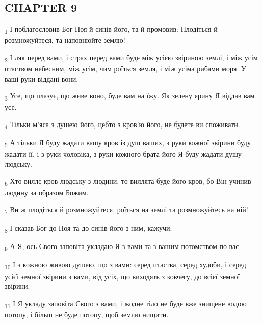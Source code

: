 \subsection{CHAPTER 9}
\begin{tcolorbox}
\textsubscript{1} І поблагословив Бог Ноя й синів його, та й промовив: Плодіться й розмножуйтеся, та наповнюйте землю!
\end{tcolorbox}
\begin{tcolorbox}
\textsubscript{2} І ляк перед вами, і страх перед вами буде між усією звіриною землі, і між усім птаством небесним, між усім, чим роїться земля, і між усіма рибами моря. У ваші руки віддані вони.
\end{tcolorbox}
\begin{tcolorbox}
\textsubscript{3} Усе, що плазує, що живе воно, буде вам на їжу. Як зелену ярину Я віддав вам усе.
\end{tcolorbox}
\begin{tcolorbox}
\textsubscript{4} Тільки м'яса з душею його, цебто з кров'ю його, не будете ви споживати.
\end{tcolorbox}
\begin{tcolorbox}
\textsubscript{5} А тільки Я буду жадати вашу кров із душ ваших, з руки кожної звірини буду жадати її, і з руки чоловіка, з руки кожного брата його Я буду жадати душу людську.
\end{tcolorbox}
\begin{tcolorbox}
\textsubscript{6} Хто виллє кров людську з людини, то виллята буде його кров, бо Він учинив людину за образом Божим.
\end{tcolorbox}
\begin{tcolorbox}
\textsubscript{7} Ви ж плодіться й розмножуйтеся, роїться на землі та розмножуйтесь на ній!
\end{tcolorbox}
\begin{tcolorbox}
\textsubscript{8} І сказав Бог до Ноя та до синів його з ним, кажучи:
\end{tcolorbox}
\begin{tcolorbox}
\textsubscript{9} А Я, ось Свого заповіта укладаю Я з вами та з вашим потомством по вас.
\end{tcolorbox}
\begin{tcolorbox}
\textsubscript{10} І з кожною живою душею, що з вами: серед птаства, серед худоби, і серед усієї земної звірини з вами, від усіх, що виходять з ковчегу, до всієї земної звірини.
\end{tcolorbox}
\begin{tcolorbox}
\textsubscript{11} І Я укладу заповіта Свого з вами, і жодне тіло не буде вже знищене водою потопу, і більш не буде потопу, щоб землю нищити.
\end{tcolorbox}
